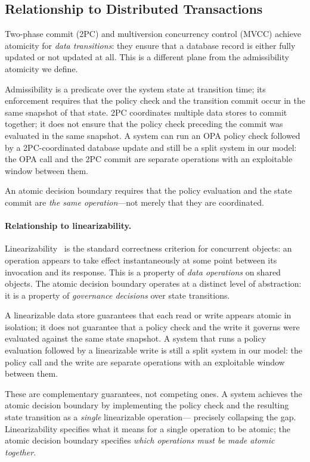 \documentclass[11pt]{article}
\theoremstyle{plain}
\theoremstyle{definition}
\theoremstyle{remark}
\begin{document}
\subsection{Relationship to Distributed Transactions}
\label{sec:dist}

Two-phase commit (2PC) and multiversion concurrency control (MVCC) achieve
atomicity for \emph{data transitions}: they ensure that a database record is
either fully updated or not updated at all.  This is a different plane from
the admissibility atomicity we define.

Admissibility is a predicate over the system state at transition time; its
enforcement requires that the policy check and the transition commit occur in
the same snapshot of that state.  2PC coordinates multiple data stores to
commit together; it does not ensure that the policy check preceding the
commit was evaluated in the same snapshot.  A system can run an OPA policy
check followed by a 2PC-coordinated database update and still be a split
system in our model: the OPA call and the 2PC commit are separate operations
with an exploitable window between them.

An atomic decision boundary requires that the policy evaluation and the state
commit are \emph{the same operation}---not merely that they are coordinated.

\paragraph{Relationship to linearizability.}
Linearizability~\cite{herlihy90} is the standard correctness criterion for
concurrent objects: an operation appears to take effect instantaneously at
some point between its invocation and its response.  This is a property of
\emph{data operations} on shared objects.  The atomic decision boundary
operates at a distinct level of abstraction: it is a property of
\emph{governance decisions} over state transitions.

A linearizable data store guarantees that each read or write appears atomic
in isolation; it does not guarantee that a policy check and the write it
governs were evaluated against the same state snapshot.  A system that runs a
policy evaluation followed by a linearizable write is still a split system in
our model: the policy call and the write are separate operations with an
exploitable window between them.

These are complementary guarantees, not competing ones.  A system achieves
the atomic decision boundary by implementing the policy check and the
resulting state transition as a \emph{single} linearizable operation---
precisely collapsing the gap.  Linearizability specifies what it means for a
single operation to be atomic; the atomic decision boundary specifies
\emph{which operations must be made atomic together}.
\end{document}
